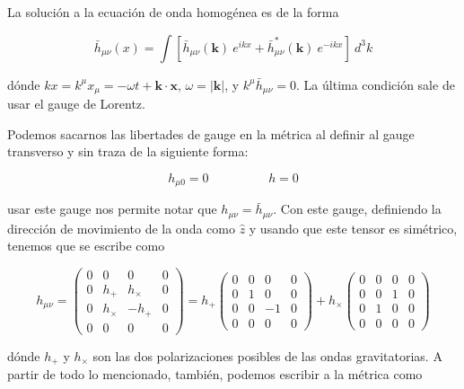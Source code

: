 La solución a la ecuación de onda homogénea es de la forma

\begin{equation}
    \bar{h}_{\mu \nu} (x) = \int \left[ \bar{h}_{\mu \nu} (\textbf{k}) \ e^{ikx} + \bar{h}^*_{\mu \nu} (\textbf{k}) \ e^{-ikx} \right] \ d^3 k
\end{equation}

\noindent
dónde $kx = k^\mu x_\mu = - \omega t + \textbf{k} \cdot \textbf{x}$, $\omega = \left| \textbf{k} \right|$, y $k^\mu \bar{h}_{\mu \nu} = 0$. La última condición sale de usar el gauge de Lorentz.

Podemos sacarnos las libertades de gauge en la métrica al definir al gauge transverso y sin traza de la siguiente forma:

\begin{equation}
    h_{\mu 0} = 0 \hspace{2cm} h = 0
\end{equation}

\noindent
usar este gauge nos permite notar que $h_{\mu \nu} = \bar{h}_{\mu \nu}$. Con este gauge, definiendo la dirección de movimiento de la onda como $\hat{z}$ y usando que este tensor es simétrico, tenemos que se escribe como

\begin{equation}
    h_{\mu \nu} = \begin{pmatrix}
        0 & 0 & 0 & 0\\
        0 & h_+ & h_\times & 0\\
        0 & h_\times & - h_+ & 0\\
        0 & 0 & 0 & 0
    \end{pmatrix} = h_+ \begin{pmatrix}
        0 & 0 & 0 & 0\\
        0 & 1 & 0 & 0\\
        0 & 0 & -1 & 0\\
        0 & 0 & 0 & 0
    \end{pmatrix} + h_\times \begin{pmatrix}
        0 & 0 & 0 & 0\\
        0 & 0 & 1 & 0\\
        0 & 1 & 0 & 0\\
        0 & 0 & 0 & 0
    \end{pmatrix}
\end{equation}

\noindent
dónde $h_+$ y $h_\times$ son las dos polarizaciones posibles de las ondas gravitatorias. A partir de todo lo mencionado, también, podemos escribir a la métrica como

